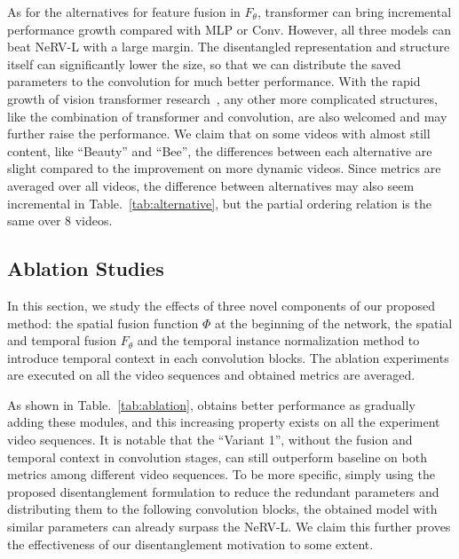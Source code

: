 \documentclass[runningheads]{llncs}
\begin{document}
As for the alternatives for feature fusion in $F_\theta$, transformer can bring incremental performance growth compared with MLP or Conv. However, all three models can beat NeRV-L with a large margin. The disentangled representation and structure itself can significantly lower the size, so that we can distribute the saved parameters to the convolution for much better performance. With the rapid growth of vision transformer research~\cite{han2020survey}, any other more complicated structures, like the combination of transformer and convolution, are also welcomed and may further raise the performance. We claim that on some videos with almost still content, like ``Beauty'' and ``Bee'', the differences between each alternative are slight compared to the improvement on more dynamic videos. Since metrics are averaged over all videos, the difference between alternatives may also seem incremental in Table.~\ref{tab:alternative}, but the partial ordering relation is the same over $8$ videos.


\subsection{Ablation Studies}
\label{ablation}

In this section, we study the effects of three novel components of our proposed method: the spatial fusion function $\Phi$ at the beginning of the network, the spatial and temporal fusion $F_\theta$ and the temporal instance normalization method to introduce temporal context in each convolution blocks. The ablation experiments are executed on all the video sequences and obtained metrics are averaged.

As shown in Table.~\ref{tab:ablation}, \netname obtains better performance as gradually adding these modules, and this increasing property exists on all the experiment video sequences. It is notable that the ``Variant 1'', without the fusion and temporal context in convolution stages, can still outperform baseline on both metrics among different video sequences. To be more specific, simply using the proposed disentanglement formulation to reduce the redundant parameters and distributing them to the following convolution blocks, the obtained model with similar parameters can already surpass the NeRV-L. We claim this further proves the effectiveness of our disentanglement motivation to some extent.
\end{document}
